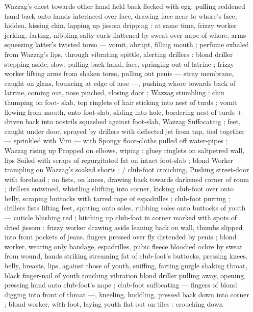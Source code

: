 Wazzag's chest towards other hand held back flecked with egg. 
pulling reddened hand back onto hands interlaced over face, drawing 
face near to whore's face, hidden, kissing chin, lapping up jissom 
dripping : at same time, frizzy worker jerking, farting, nibbling salty 
curls flattened by sweat over nape of whore, arms squeezing latter's 
twisted torso --- vomit, abrupt, filling mouth ; perfume exhaled from 
Wazzag's lips, through vibrating spittle, alerting drillers : blond 
driller stepping aside, slow, pulling back hand, face, springing out of 
latrine ; frizzy worker lifting arms from shaken torso, pulling out 
penis --- stray membrane, caught on glans, bouncing at edge of arse 
---, pushing whore towards back of latrine, coming out, nose 
pinched, closing door ; Wazzag stumbling ; chin thumping on foot- 
slab, top ringlets of hair sticking into nest of turds ; vomit flowing 
from mouth, onto foot-slab, sliding into hole, bordering nest of turds 
+ driven back into nostrils squashed against foot-slab, Wazzag 
Suffocating ; feet, caught under door, sprayed by drillers with 
deflected jet from tap, tied together --- sprinkled with Vim --- with 
Spongy floor-cloths pulled off water-pipes ; Wazzag rising up 
Propped on elbows, wiping : gluey ringlets on saltpetred wall, lips 
Soiled with scraps of regurgitated fat on intact foot-slab ; blond 
Worker trampling on Wazzag's soaked shorts ; {\slash} club-foot crouching, 
Pushing street-door with forehead ; on fists, on knees, drawing back 
towards darkened corner of room ; drillers entwined, whistling 
shifting into corner, kicking club-foot over onto belly, scraping 
buttocks with tarred rope of espadrilles ; club-foot purring ; drillers 
fists lifting feet, spitting onto soles, rubbing soles onto buttocks of 
youth --- cuticle blushing red ; hitching up club-foot in corner 
marked with spots of dried jissom ; frizzy worker drawing aside 
leaning back on wall, thumbs slipped into front pockets of jeans. 
fingers pressed over fly distended by penis ; blond worker, wearing 
only bandage, espadrilles, pubic fleece bloodied ochre by sweat from 
wound, hands striking streaming fat of club-foot's buttocks, pressing 
knees, belly, breasts, lips, against those of youth, sniffing, farting 
gurgle shaking throat, black finger-nail of youth touching vibration 
blond driller pulling away, opening, pressing hand onto club-foot's 
nape ; club-foot suffocating --- fingers of blond digging into front of 
throat ---, kneeling, huddling, pressed back down into corner ; blond 
worker, with foot, laying youth flat out on tiles : crouching down 
